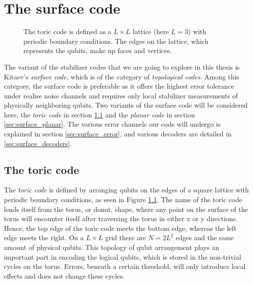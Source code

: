 

\chapter{The surface code}

\begin{figure}[h]
  \centering
  \caption{The toric code is defined as a $L\times L$ lattice (here $L=3$) with periodic boundary conditions. The edges on the lattice, which represents the qubits, make up faces and vertices.}\label{fig:sf_toriclattice}
\end{figure}

The variant of the stabilizer codes that we are going to explore in this thesis is Kitaev's \emph{surface code}, which is of the category of \emph{topological codes}. Among this category, the surface code is preferable as it offers the highest error tolerance under realise noise channels and requires only local stabilizer measurements of physically neighboring qubits. Two variants of the surface code will be considered here, the \emph{toric code} in section \ref{sec:surface_toric} and the \emph{planar code} in section \ref{sec:surface_planar}. The various error channels our code will undergo is explained in section \ref{sec:surface_error}, and various decoders are detailed in \ref{sec:surface_decoders}.


\section{The toric code}\label{sec:surface_toric}

The \emph{toric code} is defined by arranging qubits on the edges of a square lattice with periodic boundary conditions, as seen in Figure \ref{fig:sf_toriclattice}. The name of the toric code lends itself from the torus, or donut, shape, where any point on the surface of the torus will encounter itself after traversing the torus in either x or y directions. Hence, the top edge of the toric code meets the bottom edge, whereas the left edge meets the right. On a $L\times L$ grid there are $N = 2L^2$ edges and the same amount of physical qubits. This topology of qubit arrangement plays an important part in encoding the logical qubits, which is stored in the non-trivial cycles on the torus. Errors, beneath a certain threshold, will only introduce local effects and does not change these cycles.

